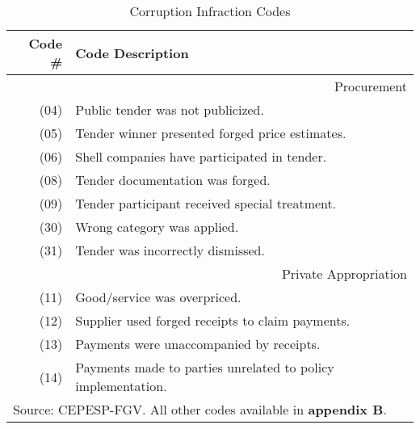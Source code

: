 \documentclass[11pt]{article}
\author{Andre Assumpcao}
\newcommand\T{\rule{0pt}{2.6ex}}       %
\newcommand\B{\rule[-1.2ex]{0pt}{0pt}} %
\begin{document}
\begin{table}[!htbp]
  \caption{\label{tab:corruptioncodes} Corruption Infraction Codes}
  \centering
  \small
  \begin{tabular}{r|l}
  \hline

  \hline
  Code \# & Code Description                                          \T \B \\
  \hline
  \multicolumn{2}{r}{Procurement}                                     \T \B \\
  \hline
  (04) & Public tender was not publicized.                            \T \B \\
  (05) & Tender winner presented forged price estimates.              \T \B \\
  (06) & Shell companies have participated in tender.                 \T \B \\
  (08) & Tender documentation was forged.                             \T \B \\
  (09) & Tender participant received special treatment.               \T \B \\
  (30) & Wrong category was applied.                                  \T \B \\
  (31) & Tender was incorrectly dismissed.                            \T \B \\
  \hline
  \multicolumn{2}{r}{Private Appropriation}                           \T \B \\
  \hline
  (11) & Good/service was overpriced.                                 \T \B \\
  (12) & Supplier used forged receipts to claim payments.      \T \B \\
  (13) & Payments were unaccompanied by receipts.                     \T \B \\
  (14) & Payments made to parties unrelated to policy implementation. \T \B \\
  \hline

  \hline
  \multicolumn{2}{l}{\footnotesize Source: CEPESP-FGV. All other codes available in {\bf appendix B}.} \T
  \end{tabular}
\end{table}
\end{document}
